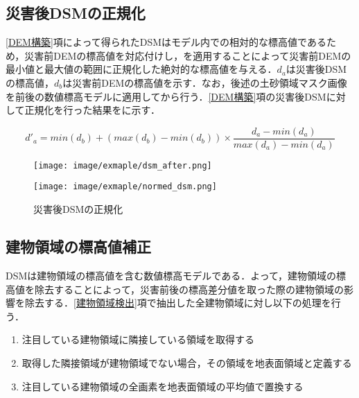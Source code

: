     \subsection{災害後DSMの正規化}
      \label{災害後DSMの正規化}
      \ref{DEM構築}項によって得られたDSMはモデル内での相対的な標高値であるため，災害前DEMの標高値を対応付けし，を適用することによって災害前DEMの最小値と最大値の範囲に正規化した絶対的な標高値を与える．$d_{a}$は災害後DSMの標高値，$d_{b}$は災害前DEMの標高値を示す．なお，後述の土砂領域マスク画像を前後の数値標高モデルに適用してから行う．\ref{DEM構築}項の災害後DSMに対して正規化を行った結果をに示す．

      \begin{equation}
        \label{正規化}
        d'_{a} =  
          min(d_{b}) + (max(d_{b}) - min(d_{b})) \times
          \dfrac{d_{a} - min(d_{a})} {max(d_{a}) - min(d_{a})}
      \end{equation}

      \begin{figure}[tbp]
        \begin{minipage}[c]{0.5\hsize}
          \centering
          \texttt{[image: image/exmaple/dsm\_after.png]}
        \end{minipage}
        \begin{minipage}[c]{0.5\hsize}
          \centering
          \texttt{[image: image/exmaple/normed\_dsm.png]}
        \end{minipage}
        \caption{災害後DSMの正規化}
        \label{災害後DSMの正規化結果}
      \end{figure}


    \subsection{建物領域の標高値補正}
      DSMは建物領域の標高値を含む数値標高モデルである．よって，建物領域の標高値を除去することによって，災害前後の標高差分値を取った際の建物領域の影響を除去する．\ref{建物領域検出}項で抽出した全建物領域に対し以下の処理を行う．

      \begin{enumerate}
        \setlength{\itemsep}{-5pt}
        \item 注目している建物領域に隣接している領域を取得する
        \item 取得した隣接領域が建物領域でない場合，その領域を地表面領域と定義する
        \item 注目している建物領域の全画素を地表面領域の平均値で置換する
      \end{enumerate}

